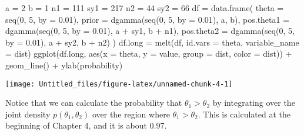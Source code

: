 \documentclass[
]{article}
\newenvironment{Shaded}{\begin{snugshade}}{\end{snugshade}}
\newcommand{\AttributeTok}[1]{\textcolor[rgb]{0.77,0.63,0.00}{#1}}
\newcommand{\DecValTok}[1]{\textcolor[rgb]{0.00,0.00,0.81}{#1}}
\newcommand{\FloatTok}[1]{\textcolor[rgb]{0.00,0.00,0.81}{#1}}
\newcommand{\FunctionTok}[1]{\textcolor[rgb]{0.00,0.00,0.00}{#1}}
\newcommand{\NormalTok}[1]{#1}
\newcommand{\OtherTok}[1]{\textcolor[rgb]{0.56,0.35,0.01}{#1}}
\newcommand{\SpecialCharTok}[1]{\textcolor[rgb]{0.00,0.00,0.00}{#1}}
\newcommand{\StringTok}[1]{\textcolor[rgb]{0.31,0.60,0.02}{#1}}
\begin{document}
\begin{Shaded}
\begin{Highlighting}[]
\NormalTok{a }\OtherTok{=} \DecValTok{2}
\NormalTok{b }\OtherTok{=} \DecValTok{1}
\NormalTok{n1 }\OtherTok{=} \DecValTok{111}
\NormalTok{sy1 }\OtherTok{=} \DecValTok{217}
\NormalTok{n2 }\OtherTok{=} \DecValTok{44}
\NormalTok{sy2 }\OtherTok{=} \DecValTok{66}
\NormalTok{df }\OtherTok{=} \FunctionTok{data.frame}\NormalTok{(}
  \AttributeTok{theta =} \FunctionTok{seq}\NormalTok{(}\DecValTok{0}\NormalTok{, }\DecValTok{5}\NormalTok{, }\AttributeTok{by =} \FloatTok{0.01}\NormalTok{),}
  \AttributeTok{prior =} \FunctionTok{dgamma}\NormalTok{(}\FunctionTok{seq}\NormalTok{(}\DecValTok{0}\NormalTok{, }\DecValTok{5}\NormalTok{, }\AttributeTok{by =} \FloatTok{0.01}\NormalTok{), a, b),}
  \AttributeTok{pos.theta1 =} \FunctionTok{dgamma}\NormalTok{(}\FunctionTok{seq}\NormalTok{(}\DecValTok{0}\NormalTok{, }\DecValTok{5}\NormalTok{, }\AttributeTok{by =} \FloatTok{0.01}\NormalTok{), a }\SpecialCharTok{+}\NormalTok{ sy1, b }\SpecialCharTok{+}\NormalTok{ n1),}
  \AttributeTok{pos.theta2 =} \FunctionTok{dgamma}\NormalTok{(}\FunctionTok{seq}\NormalTok{(}\DecValTok{0}\NormalTok{, }\DecValTok{5}\NormalTok{, }\AttributeTok{by =} \FloatTok{0.01}\NormalTok{), a }\SpecialCharTok{+}\NormalTok{ sy2, b }\SpecialCharTok{+}\NormalTok{ n2)}
\NormalTok{)}
\NormalTok{df.long }\OtherTok{=} \FunctionTok{melt}\NormalTok{(df, }\AttributeTok{id.vars =} \StringTok{\textquotesingle{}theta\textquotesingle{}}\NormalTok{, }\AttributeTok{variable\_name =} \StringTok{\textquotesingle{}dist\textquotesingle{}}\NormalTok{)}
\FunctionTok{ggplot}\NormalTok{(df.long, }\FunctionTok{aes}\NormalTok{(}\AttributeTok{x =}\NormalTok{ theta, }\AttributeTok{y =}\NormalTok{ value, }\AttributeTok{group =}\NormalTok{ dist, }\AttributeTok{color =}\NormalTok{ dist)) }\SpecialCharTok{+}
  \FunctionTok{geom\_line}\NormalTok{() }\SpecialCharTok{+}
  \FunctionTok{ylab}\NormalTok{(}\StringTok{\textquotesingle{}probability\textquotesingle{}}\NormalTok{)}
\end{Highlighting}
\end{Shaded}

\begin{center}\texttt{[image: Untitled\_files/figure-latex/unnamed-chunk-4-1]} \end{center}

Notice that we can calculate the probability that
\(\theta_1 > \theta_2\) by integrating over the joint density
\(p(\theta_1, \theta_2)\) over the region where \(\theta_1 > \theta_2\).
This is calculated at the beginning of Chapter 4, and it is about 0.97.
\end{document}
